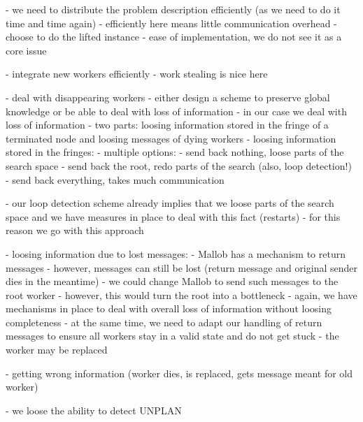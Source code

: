 - we need to distribute the problem description efficiently (as we need to do it time and time again)
	- efficiently here means little communication overhead
	- choose to do the lifted instance
	- ease of implementation, we do not see it as a core issue

- integrate new workers efficiently
	- work stealing is nice here

- deal with disappearing workers
	- either design a scheme to preserve global knowledge or be able to deal with loss of information
	- in our case we deal with loss of information
	- two parts: loosing information stored in the fringe of a terminated node and loosing messages of dying workers
	- loosing information stored in the fringes:
		- multiple options:
			- send back nothing, loose parts of the search space
			- send back the root, redo parts of the search (also, loop detection!)
			- send back everything, takes much communication
			
			- our loop detection scheme already implies that we loose parts of the search space and we have measures in place to deal with this fact (restarts)
			- for this reason we go with this approach
			
	- loosing information due to lost messages:
		- Mallob has a mechanism to return messages
		- however, messages can still be lost (return message and original sender dies in the meantime)
		- we could change Mallob to send such messages to the root worker
		- however, this would turn the root into a bottleneck
		- again, we have mechanisms in place to deal with overall loss of information without loosing completeness
		- at the same time, we need to adapt our handling of return messages to ensure all workers stay in a valid state and do not get stuck
		- the worker may be replaced
		
	- getting wrong information (worker dies, is replaced, gets message meant for old worker)
	
	- we loose the ability to detect UNPLAN